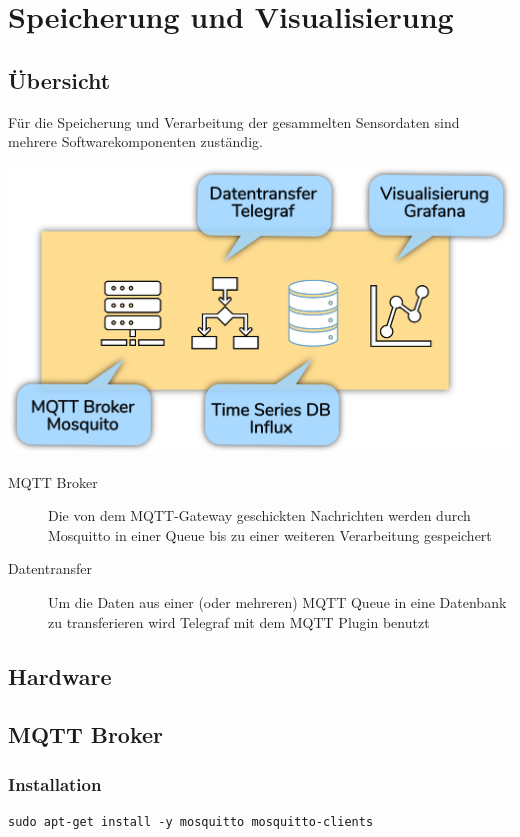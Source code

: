 \documentclass[
  12pt, %
  a4paper, %
  twoside, %
  openany, %
  numbers=noenddot, %
  BCOR=5mm, %
  parskip=half*, %
  thesis, %
]{bfhbook}
\begin{document}
\chapter{Speicherung und Visualisierung}
\section{Übersicht}
Für die Speicherung und Verarbeitung der gesammelten Sensordaten sind mehrere Softwarekomponenten zuständig.
\begin{center}
\includegraphics[width=17cm, left]{Bilder/Raspberry-Software.png}%
\label{labelname}%
\end{center}
 \begin{description}
\item[MQTT Broker] Die von dem MQTT-Gateway geschickten Nachrichten werden durch Mosquitto \cite{mosquitto} in einer Queue bis zu einer weiteren Verarbeitung gespeichert
\item[Datentransfer] Um die Daten aus einer (oder mehreren) MQTT Queue in eine Datenbank zu transferieren wird Telegraf \cite{telegraf} mit dem MQTT Plugin benutzt \cite{telegrafmqtt}
\end{description}
\section{Hardware}
\section{MQTT Broker}
\subsection{Installation}
\begin{verbatim}
sudo apt-get install -y mosquitto mosquitto-clients
   \end{verbatim}
\end{document}
